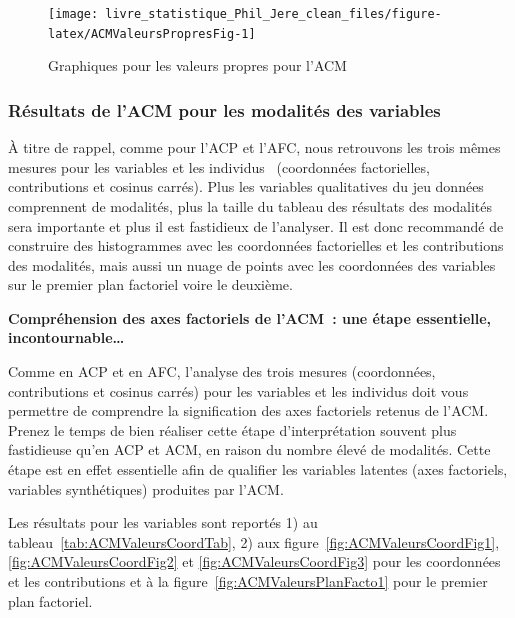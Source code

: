 \documentclass[
  11pt,
  french,
]{book}
\makeatletter
\newenvironment{kframev}{%
\medskip{}
\setlength{\fboxsep}{.8em}
 \def\at@end@of@kframev{}%
 \ifinner\ifhmode%
  \def\at@end@of@kframev{\end{minipage}}%
  \begin{minipage}{\columnwidth}%
 \fi\fi%
 \def\FrameCommand##1{\hskip\@totalleftmargin \hskip-\fboxsep
 \colorbox{shadebluecolor}{##1}\hskip-\fboxsep
     \hskip-\linewidth \hskip-\@totalleftmargin \hskip\columnwidth}%
 \MakeFramed {\advance\hsize-\width
   \@totalleftmargin\z@ \linewidth\hsize
   \@setminipage}}%
 {\par\unskip\endMakeFramed%
 \at@end@of@kframev}
\newenvironment{rmdblock}[1]
  {
  \begin{itemize}
  \renewcommand{\labelitemi}{
    \raisebox{-.7\height}[0pt][0pt]{
      {\setkeys{Gin}{width=3em,keepaspectratio}\texttt{[image: images/\#1]}}
    }
  }
  \setlength{\fboxsep}{1em}
  \begin{kframev}
  \small
  \item
  }
  {
  \end{kframev}
  \end{itemize}
  }
\newenvironment{bloc_objectif}
  {\begin{rmdblock}{objectif}}
  {\end{rmdblock}}
\makeatother
\begin{document}
\begin{figure}

{\centering \texttt{[image: livre\_statistique\_Phil\_Jere\_clean\_files/figure-latex/ACMValeursPropresFig-1]} 

}

\caption{Graphiques pour les valeurs propres pour l'ACM}\label{fig:ACMValeursPropresFig}
\end{figure}

\hypertarget{sect12412}{%
\subsubsection{Résultats de l'ACM pour les modalités des variables}\label{sect12412}}

À titre de rappel, comme pour l'ACP et l'AFC, nous retrouvons les trois mêmes mesures pour les variables et les individus~ (coordonnées factorielles, contributions et cosinus carrés). Plus les variables qualitatives du jeu données comprennent de modalités, plus la taille du tableau des résultats des modalités sera importante et plus il est fastidieux de l'analyser. Il est donc recommandé de construire des histogrammes avec les coordonnées factorielles et les contributions des modalités, mais aussi un nuage de points avec les coordonnées des variables sur le premier plan factoriel voire le deuxième.

\begin{bloc_objectif}
\textbf{Compréhension des axes factoriels de l'ACM~: une étape essentielle, incontournable\ldots{}}

Comme en ACP et en AFC, l'analyse des trois mesures (coordonnées, contributions et cosinus carrés) pour les variables et les individus doit vous permettre de comprendre la signification des axes factoriels retenus de l'ACM. Prenez le temps de bien réaliser cette étape d'interprétation souvent plus fastidieuse qu'en ACP et ACM, en raison du nombre élevé de modalités. Cette étape est en effet essentielle afin de qualifier les variables latentes (axes factoriels, variables synthétiques) produites par l'ACM.

\end{bloc_objectif}

Les résultats pour les variables sont reportés 1) au tableau~\ref{tab:ACMValeursCoordTab}, 2) aux figure~\ref{fig:ACMValeursCoordFig1}, \ref{fig:ACMValeursCoordFig2} et \ref{fig:ACMValeursCoordFig3} pour les coordonnées et les contributions et à la figure~\ref{fig:ACMValeursPlanFacto1} pour le premier plan factoriel.
\end{document}
